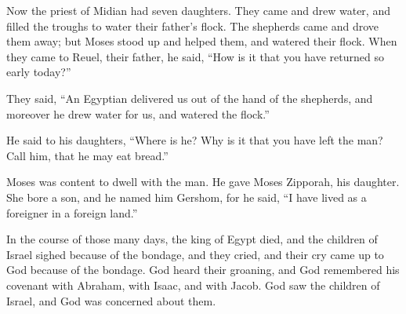 {\par }{\PP {}Now the priest of Midian had seven daughters. They came and drew water, and filled the troughs to water their father’s flock.
The shepherds came and drove them away; but Moses stood up and helped them, and watered their flock.
When they came to Reuel, their father, he said, “How is it that you have returned so early today?”
\par }{\PP {}They said, “An Egyptian delivered us out of the hand of the shepherds, and moreover he drew water for us, and watered the flock.”
\par }{\PP {}He said to his daughters, “Where is he? Why is it that you have left the man? Call him, that he may eat bread.”
\par }{\PP {}Moses was content to dwell with the man. He gave Moses Zipporah, his daughter.
She bore a son, and he named him Gershom, for he said, “I have lived as a foreigner in a foreign land.”
\par }{\PP {}In the course of those many days, the king of Egypt died, and the children of Israel sighed because of the bondage, and they cried, and their cry came up to God because of the bondage.
God heard their groaning, and God remembered his covenant with Abraham, with Isaac, and with Jacob.
God saw the children of Israel, and God was concerned about them.

}
